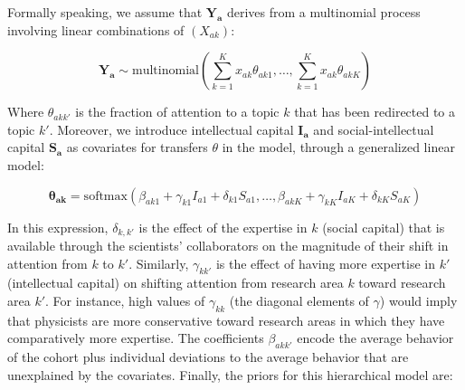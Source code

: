 \documentclass{article}
\begin{document}
Formally speaking, we assume that $\bm{Y_{a}}$ derives from a multinomial process involving linear combinations of $(X_{ak})$:

\begin{equation}
    \bm{Y_a} \sim \text{multinomial}(\sum_{k=1}^{K} x_{ak}\theta_{ak1} ,\dots,\sum_{k=1}^{K}x_{ak}\theta_{akK})
\end{equation}

Where $\theta_{akk'}$ is the fraction of attention to a topic $k$ that has been redirected to a topic $k'$. %
Moreover, we introduce intellectual capital $\bm{I_a}$ and social-intellectual capital $\bm{S_a}$ as covariates for transfers $\theta$ in the model, through a generalized linear model:

\begin{equation}
    \bm{\theta_{ak}} = \text{softmax}\left(\beta_{ak1} + \gamma_{k1} I_{a1} + \delta_{k1} S_{a1}, \dots,\beta_{akK} + \gamma_{kK} I_{aK} + \delta_{kK} S_{aK}\right)
    \label{eq:glm}
\end{equation}

In this expression, $\delta_{k,k'}$ is the effect of the expertise in $k$ (social capital) that is available through the scientists' collaborators on the magnitude of their shift in attention from $k$ to $k'$. Similarly, $\gamma_{kk'}$ is the effect of having more expertise in $k'$ (intellectual capital) on shifting attention from research area $k$ toward research area $k'$. For instance, high values of $\gamma_{kk}$ (the diagonal elements of $\gamma$) would imply that physicists are more conservative toward research areas in which they have comparatively more expertise. The coefficients $\beta_{akk'}$ encode the average behavior of the cohort plus individual deviations to the average behavior that are unexplained by the covariates. Finally, the priors for this hierarchical model are:
\end{document}
